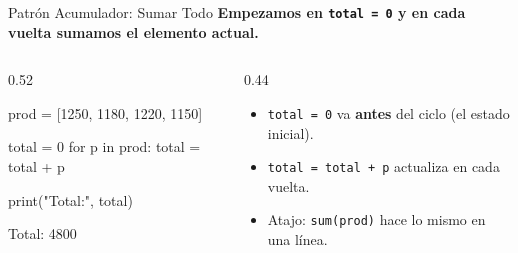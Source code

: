 \documentclass[aspectratio=169, 11pt]{beamer}
\begin{document}
\begin{frame}[fragile,shrink=10]{Patrón Acumulador: Sumar Todo}
  \vspace{-4pt}
  {\small\color{arcaDark}\bfseries
    Empezamos en \texttt{total = 0} y en cada vuelta \textbf{sumamos} el elemento actual.}

  \vspace{5pt}
  \begin{columns}[T]
    \begin{column}{0.52\textwidth}
      \begin{pyblock}
prod = [1250, 1180, 1220, 1150]

total = 0
for p in prod:
    total = total + p

print("Total:", total)
      \end{pyblock}
      \vspace{2pt}
      \begin{outputblock}
Total: 4800
      \end{outputblock}
    \end{column}

    \begin{column}{0.44\textwidth}
      {\scriptsize\color{textMuted}
      \begin{itemize}\setlength{\itemsep}{5pt}
        \item[{\color{arcaRed}\scriptsize\faArrowRight}]
          \texttt{total = 0} va \textbf{antes} del
          ciclo (el estado inicial).
        \item[{\color{arcaRed}\scriptsize\faArrowRight}]
          \texttt{total = total + p} actualiza
          en cada vuelta.
        \item[{\color{codeGreen}\scriptsize\faCheck}]
          Atajo: \texttt{sum(prod)} hace lo mismo
          en una línea.
      \end{itemize}
      }
    \end{column}
  \end{columns}
\end{frame}
\end{document}
